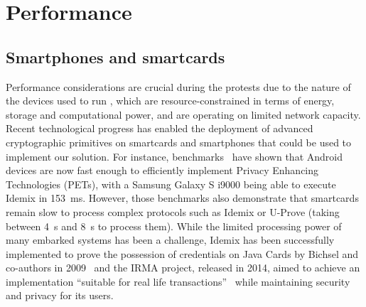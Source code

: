 \section{Performance}
\label{PerformanceAnalysis}

\subsection{Smartphones and smartcards}
Performance considerations are crucial during the protests due to the nature of the devices used to run \CROCUS, which are resource-constrained in terms of energy, storage and computational power, and are operating on limited network capacity. 
Recent technological progress has enabled the deployment of advanced cryptographic primitives on smartcards and smartphones that could be used to implement our solution.
For instance, benchmarks~\cite{Benchmarking} have shown that Android devices are now fast enough to efficiently implement Privacy Enhancing Technologies (PETs), with a Samsung Galaxy S i9000 being able to execute Idemix in \SI{153}{\milli\second}. 
However, those benchmarks also demonstrate that smartcards remain slow to process complex protocols such as Idemix or U-Prove (taking between \SI{4}{\second} and \SI{8}{\second} to process them). 
While the limited processing power of many embarked systems has been a challenge, Idemix has been successfully implemented to prove the possession of credentials on Java Cards by Bichsel and co-authors in 2009~\cite{Bichsel} and the IRMA project, released in 2014, aimed to achieve an implementation ``suitable for real life transactions''~\cite{IRMA} while maintaining security and privacy for its users. 

